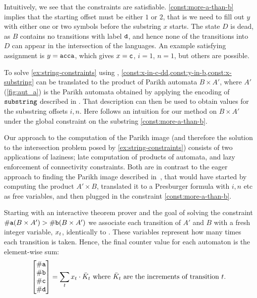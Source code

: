 Intuitively, we see that the constraints are satisfiable.
\cref{const:more-a-than-b} implies that the starting offset must be either $1$
or $2$, that is we need to fill out $y$ with either one or two symbols before
the substring $x$ starts. The state $D$ is dead, as $B$ contains no transitions
with label $\texttt{d}$, and hence none of the transitions into $D$ can appear in
the intersection of the languages. An example satisfying assignment is $y =
\texttt{acca}$, which gives $x = \texttt{c}$, $i = 1$, $n = 1$, but others are
possible.

To solve \cref{ex:string-constraints} using \Calculus{},
\cref{const:x-in-c-dd,const:y-in-b,const:x-substring} can be translated to the
product of Parikh automata $B \times A'$, where $A'$ (\cref{fig:aut_a}) is the
Parikh automata obtained by applying the encoding of $\operatorname{\mathtt{substring}}$ described in
\cite{ostrich-plus}. That description can then be used to obtain values for the
subsstring offsets $i, n$. Here follows an intuition for our method on $B \times
A'$ under the global constraint on the substring \cref{const:more-a-than-b}.

Our approach to the computation of the Parikh image (and therefore the solution
to the intersection problem posed by \cref{ex:string-constraints}) consists of
two applications of laziness; late computation of products of automata, and lazy
enforcement of connectivity constraints. Both are in contrast to the eager
approach to finding the Parikh image described in~\cite{generate-parikh-image},
that would have started by computing the product $A' \times B$, translated it to
a Presburger formula with $i, n$ etc as free variables, and then plugged in the
constraint \cref{const:more-a-than-b}.

Starting with an interactive theorem prover and the goal of solving the
constraint $\#\text{\texttt{a}}(B \times A') > \#\text{\texttt{b}}(B \times A')$
we associate each transition of $A'$ and $B$ with a fresh integer variable,
$x_t$, identically to \cite{generate-parikh-image}. These
variables represent how many times each transition is taken. Hence, the final
counter value for each automaton is the element-wise sum:
\begin{equation}
\begin{bmatrix} 
  \#\text{\texttt{a}} \\ \#\text{\texttt{b}} 
  \\ \#\text{\texttt{c}} \\ \#\text{\texttt{d}} 
\end{bmatrix} = \sum_t x_t \cdot 
  \bar{K}_t \text{ where $\bar{K}_t$ are the increments of transition $t$}.
\end{equation}

